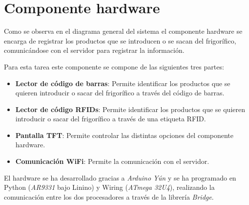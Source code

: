 \section{Componente hardware}

Como se observa en el diagrama general del sistema el componente hardware se encarga de registrar los productos que se introducen o se sacan del frigorífico, comunicándose con el servidor para registrar la información.

Para esta tarea este componente se compone de las siguientes tres partes:

\begin{itemize}
    \item \textbf{Lector de código de barras}: Permite identificar los productos que se quieren introducir o sacar del frigorífico a través del código de barras.
    \item \textbf{Lector de código RFIDs}: Permite identificar los productos que se quieren introducir o sacar del frigorífico a través de una etiqueta RFID.
    \item \textbf{Pantalla TFT}: Permite controlar las distintas opciones del componente hardware.
    \item \textbf{Comunicación WiFi}: Permite la comunicación con el servidor.
\end{itemize}

El hardware se ha desarrollado gracias a \emph{Arduino Yún} y se ha programado en Python (\emph{AR9331} bajo Linino) y Wiring (\emph{ATmega 32U4}), realizando la comunicación entre los dos procesadores a través de la librería \emph{Bridge}.